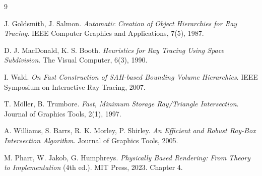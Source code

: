\documentclass[11pt]{article}
\begin{document}
\begin{thebibliography}{9}

J. Goldsmith, J. Salmon.
\emph{Automatic Creation of Object Hierarchies for Ray Tracing}.
IEEE Computer Graphics and Applications, 7(5), 1987.

D. J. MacDonald, K. S. Booth.
\emph{Heuristics for Ray Tracing Using Space Subdivision}.
The Visual Computer, 6(3), 1990.

I. Wald.
\emph{On Fast Construction of SAH-based Bounding Volume Hierarchies}.
IEEE Symposium on Interactive Ray Tracing, 2007.

T. M\"oller, B. Trumbore.
\emph{Fast, Minimum Storage Ray/Triangle Intersection}.
Journal of Graphics Tools, 2(1), 1997.

A. Williams, S. Barrs, R. K. Morley, P. Shirley.
\emph{An Efficient and Robust Ray-Box Intersection Algorithm}.
Journal of Graphics Tools, 2005.

M. Pharr, W. Jakob, G. Humphreys.
\emph{Physically Based Rendering: From Theory to Implementation} (4th ed.).
MIT Press, 2023. Chapter 4.

\end{thebibliography}
\end{document}
